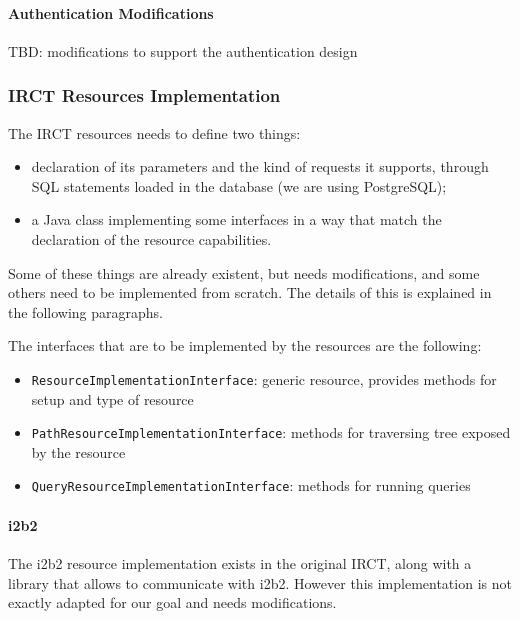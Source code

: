 \paragraph{Authentication Modifications}
TBD: modifications to support the authentication design


\subsubsection{IRCT Resources Implementation}

The IRCT resources needs to define two things:
\begin{itemize}
    \item declaration of its parameters and the kind of requests it supports, through SQL statements loaded in the database (we are using PostgreSQL);
    \item a Java class implementing some interfaces in a way that match the declaration of the resource capabilities.
\end{itemize}

Some of these things are already existent, but needs modifications, and some others need to be implemented from scratch.
The details of this is explained in the following paragraphs.

The interfaces that are to be implemented by the resources are the following:
\begin{itemize}
    \item \verb|ResourceImplementationInterface|: generic resource, provides methods for setup and type of resource
    \item \verb|PathResourceImplementationInterface|: methods for traversing tree exposed by the resource
    \item \verb|QueryResourceImplementationInterface|: methods for running queries
\end{itemize}

\paragraph{i2b2}
The i2b2 resource implementation exists in the original IRCT, along with a library that allows to communicate with i2b2.
However this implementation is not exactly adapted for our goal and needs modifications.

